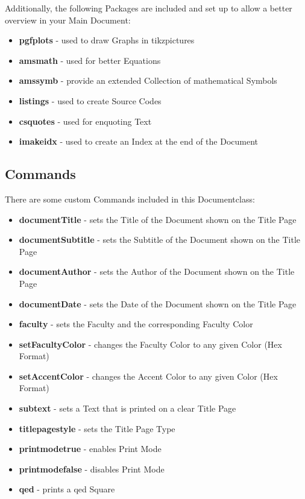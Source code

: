 \documentclass[a4paper]{../uulm-document}
\begin{document}
Additionally, the following Packages are included and set up to allow a better overview in your Main Document:
\begin{itemize}
\item \textbf{pgfplots} - used to draw Graphs in tikzpictures
\item \textbf{amsmath} - used for better Equations
\item \textbf{amssymb} - provide an extended Collection of mathematical Symbols
\item \textbf{listings} - used to create Source Codes
\item \textbf{csquotes} - used for enquoting Text
\item \textbf{imakeidx} - used to create an Index at the end of the Document
\end{itemize}

\subsection{Commands}
There are some custom Commands included in this Documentclass:
\begin{itemize}
\item \textbf{documentTitle} - sets the Title of the Document shown on the Title Page
\item \textbf{documentSubtitle} - sets the Subtitle of the Document shown on the Title Page
\item \textbf{documentAuthor} - sets the Author of the Document shown on the Title Page
\item \textbf{documentDate} - sets the Date of the Document shown on the Title Page
\item \textbf{faculty} - sets the Faculty and the corresponding Faculty Color
\item \textbf{setFacultyColor} - changes the Faculty Color to any given Color (Hex Format)
\item \textbf{setAccentColor} - changes the Accent Color to any given Color (Hex Format)
\item \textbf{subtext} - sets a Text that is printed on a clear Title Page
\item \textbf{titlepagestyle} - sets the Title Page Type
\item \textbf{printmodetrue} - enables Print Mode
\item \textbf{printmodefalse} - disables Print Mode
\item \textbf{qed} - prints a qed Square
\end{itemize}
\end{document}
